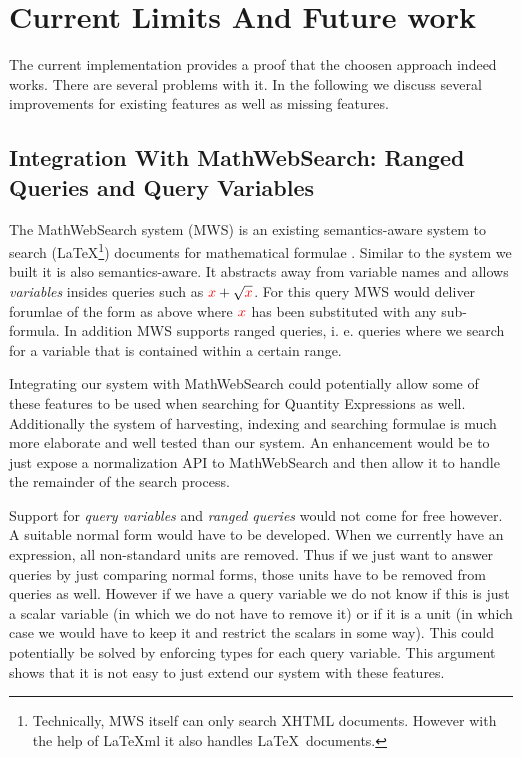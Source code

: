 \section{Current Limits And Future work}
\label{sec:future}

The current implementation provides a proof that the choosen approach indeed works. There are several problems with it. In the following we discuss several improvements for existing features as well as missing features.

\subsection{Integration With MathWebSearch: Ranged Queries and Query Variables}
The MathWebSearch system (MWS) is an existing semantics-aware system to search (\LaTeX\footnote{Technically, MWS itself can only search XHTML documents. However with the help of \LaTeX{}ml \cite{Miller:latexml:base} it also handles \LaTeX \ documents. }) documents for mathematical formulae \cite{HamKohPro:man14}. Similar to the system we built it is also semantics-aware. It abstracts away from variable names and allows \textit{variables} insides queries such as $ { \color{red} x} + \sqrt{\color{red} x}$. For this query MWS would deliver forumlae of the form as above where $ { \color{red} x} $ has been substituted with any sub-formula. In addition MWS supports ranged queries, i. e. queries where we search for a variable that is contained within a certain range.

Integrating our system with MathWebSearch could potentially allow some of these features to be used when searching for Quantity Expressions as well. Additionally the system of harvesting, indexing and searching formulae is much more elaborate and well tested than our system. An enhancement would be to just expose a normalization API to MathWebSearch and then allow it to handle the remainder of the search process.

Support for \textit{query variables} and \textit{ranged queries} would not come for free however. A suitable normal form would have to be developed. When we currently have an expression, all non-standard units are removed. Thus if we just want to answer queries by just comparing normal forms, those units have to be removed from queries as well. However if we have a query variable we do not know if this is just a scalar variable (in which we do not have to remove it) or if it is a unit (in which case we would have to keep it and restrict the scalars in some way). This could potentially be solved by enforcing types for each query variable. This argument shows that it is not easy to just extend our system with these features.

